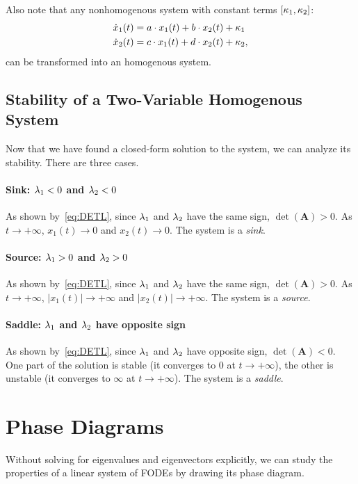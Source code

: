 \documentclass[letterpaper,12pt,leqno]{article}
\begin{document}
Also note that any nonhomogenous system with constant terms $\left[ \kappa_{1},\kappa_{2} \right]$:
\begin{align*}
\dot{x}_{1}(t) &=a\cdot x_{1}(t)+b\cdot x_{2}(t)+\kappa_{1} \\
\dot{x}_{2}(t) &=c\cdot x_{1}(t)+d\cdot x_{2}(t)+\kappa_{2},
\end{align*}
can be transformed into an homogenous system.

\subsection{Stability of a Two-Variable Homogenous System}

Now that we have found a closed-form solution to the system, we can analyze its stability. There are three cases.

\paragraph{Sink: $\lambda_{1}<0$ and $\lambda_{2}<0$} As shown by~\eqref{eq:DETL}, since $\lambda_{1}$ and $\lambda_{2}$ have the same sign, $\det(\bm{A}) >0$. As $t\to +\infty$, $x_{1}(t)\to 0$ and $x_{2}(t)\to 0$. The system is a \textit{sink}.

\paragraph{Source: $\lambda_{1}>0$ and $\lambda_{2}>0$} As shown by~\eqref{eq:DETL}, since $\lambda_{1}$ and $\lambda_{2}$ have the same sign, $\det(\bm{A}) >0$. As $t\to +\infty$, $|x_{1}(t)|\to +\infty$ and $|x_{2}(t)|\to +\infty$. The system is a \textit{source}.

\paragraph{Saddle: $\lambda_{1}$ and $\lambda_{2}$ have opposite sign} As shown by~\eqref{eq:DETL}, since $\lambda_{1}$ and $\lambda_{2}$ have opposite sign, $\det(\bm{A}) <0$. One part of the solution is stable (it converges to 0 at $t\to +\infty$), the other is unstable (it converges to $\infty$ at $t\to +\infty$). The system is a \textit{saddle}.


\section{Phase Diagrams}\label{sec:three}

Without solving for eigenvalues and eigenvectors explicitly, we can study the properties of a linear system of FODEs by drawing its phase diagram. 
\end{document}
